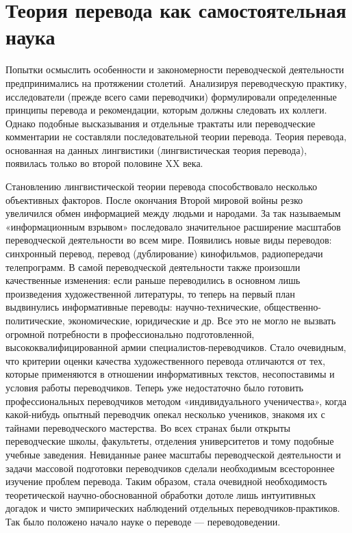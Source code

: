 \section{Теория перевода как самостоятельная наука}

Попытки осмыслить особенности и закономерности переводческой деятельности предпринимались на протяжении столетий. Анализируя переводческую практику, исследователи (прежде всего сами переводчики) формулировали определенные принципы перевода и рекомендации, которым должны следовать их коллеги. Однако подобные высказывания и          отдельные трактаты или переводческие комментарии не составляли последовательной теории перевода. Теория перевода, основанная на данных лингвистики (лингвистическая теория перевода), появилась только во второй половине XX века.

Становлению лингвистической теории перевода способствовало несколько объективных факторов. После окончания Второй мировой войны резко увеличился обмен информацией между людьми и народами. За так называемым «информационным взрывом» последовало значительное расширение масштабов переводческой деятельности во всем мире. Появились новые виды переводов: синхронный перевод, перевод (дублирование) кинофильмов, радиопередачи телепрограмм. В самой переводческой деятельности также произошли качественные изменения: если раньше переводились в основном лишь произведения художественной литературы, то теперь на первый план выдвинулись информативные переводы: научно-технические, общественно-политические, экономические, юридические и др. Все это не могло не вызвать огромной потребности в профессионально подготовленной, высококвалифицированной армии специалистов-переводчиков. Стало очевидным, что критерии оценки качества художественного перевода отличаются от тех, которые применяются в отношении информативных текстов, несопоставимы и условия работы переводчиков. Теперь уже недостаточно было готовить профессиональных переводчиков методом «индивидуального ученичества», когда какой-нибудь опытный переводчик опекал несколько учеников, знакомя их с тайнами переводческого мастерства. Во всех странах были открыты переводческие школы, факультеты, отделения университетов и тому подобные учебные заведения. Невиданные ранее масштабы переводческой деятельности и задачи массовой подготовки переводчиков сделали необходимым всестороннее изучение проблем перевода. Таким образом, стала очевидной необходимость теоретической научно-обоснованной обработки дотоле лишь интуитивных догадок и чисто эмпирических наблюдений отдельных переводчиков-практиков. Так было положено начало науке о переводе --- переводоведении.

